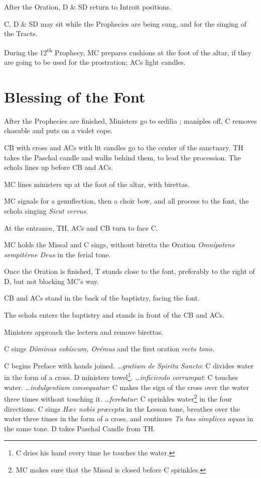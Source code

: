 {\rubric After the Oration, D \& SD return to Introit positions.

\rubric C, D \& SD may sit while the Prophecies are being sung, and for the
singing of the Tracts.

\rubric During the 12\textsuperscript{th} Prophecy, MC prepares cushions at the
foot of the altar, if they are going to be used for the prostration; ACs light
candles.

\section{Blessing of the Font}

\rubric After the Prophecies are finished, Ministers go to sedilia \pbr;
maniples off, C removes chasuble and puts on a violet cope.

\rubric CB with cross and ACs with lit candles go to the center of the
sanctuary. TH takes the Paschal candle and walks behind them, to lead the
procession. The schola lines up before CB and ACs.

\rubric MC lines ministers up at the foot of the altar, with birettas.

\rubric MC signals for a genuflection, then a choir bow, and all process to the
font, the schola singing \textit{Sicut cervus}.

\rubric At the entrance, TH, ACs and CB turn to face C.

\rubric MC holds the Missal and C sings, without biretta the Oration
\textit{Omnípotens sempitérne Deus} in the ferial tone.

\rubric Once the Oration is finished, T stands close to the font, preferably to
the right of D, but not blocking MC's way.

\rubric CB and ACs stand in the back of the baptistry, facing the font.

\rubric The schola enters the baptistry and stands in front of the CB and ACs.

\rubric Ministers approach the lectern and remove birettas.

\rubric C sings \textit{Dóminus vobíscum, Orémus} and the first oration
\textit{recto tono.}

\rubric C begins Preface with hands joined. \textit{\dots gratiam de Spiritu
Sancto}: C divides water in the form of a cross. D ministers towel\footnote{C
dries his hand every time he touches the water.}. \textit{\dots inficiendo
corrumpat}: C touches water. \textit{\dots indulgentiam consequatur}: C makes
the sign of the cross over the water three times without touching it.
\textit{\dots ferebatur}: C sprinkles water\footnote{MC makes sure that the
Missal is closed before C sprinkles.} in the four directions. C sings
\textit{Hæc nobis præcepta} in the Lesson tone, breathes over the water three
times in the form of a cross, and continues \textit{Tu has simplices aquas} in
the same tone. D takes Paschal Candle from TH.

}
